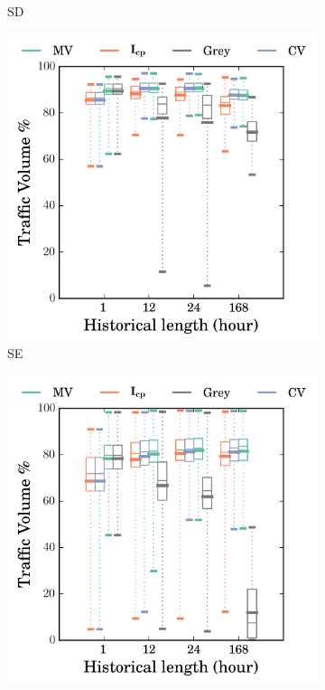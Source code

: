 \begin{figure}
\begin{subfigure}[b]{0.48\textwidth}
                \caption{SD}
                \label{fig:cvg_sd}
        \end{subfigure}
        \begin{subfigure}[b]{0.48\textwidth}
                \includegraphics[width=\textwidth]{gfx/chap2/grey_cvg_box_method_compare_fs_se.png}
                \caption{SE}
                \label{fig:cvg_se}
        \end{subfigure}
        \begin{subfigure}[b]{0.48\textwidth}
                \includegraphics[width=\textwidth]{gfx/chap2/grey_cvg_box_method_compare_fs_sf.png}

\end{subfigure}
\end{figure}

